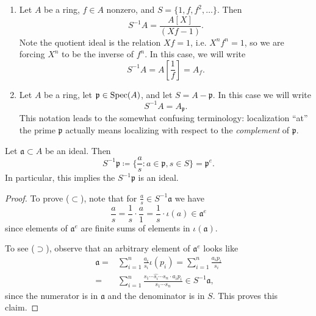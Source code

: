 \documentclass[12pt]{article}
\begin{document}
\begin{example}
	\hfill 
	\begin{enumerate}
		\item Let $A$ be a ring, $f\in A$ nonzero, and $S=\{1,f,f^2,\dots\}$. Then 
			\begin{equation*}
				S^{-1}A = \frac{A[X]}{(Xf-1)}.
			\end{equation*}
			Note the quotient ideal is the relation $Xf=1$, i.e. $X^nf^n=1$, so we are forcing $X^n$ to be the inverse of $f^n$. In this case, we will write 
			\begin{equation*}
				S^{-1}A = A[\frac{1}{f}] = A_f.
			\end{equation*}
		\item Let $A$ be a ring, let $\mathfrak{p}\in\text{Spec}(A)$, and let $S=A-\mathfrak{p}$. In this case we will write 
			\begin{equation*}
				S^{-1}A = A_\mathfrak{p}.
			\end{equation*}
			This notation leads to the somewhat confusing terminology: localization ``at'' the prime $\mathfrak{p}$ actually means localizing with respect to the \textit{complement} of $\mathfrak{p}$. 
	\end{enumerate}
\end{example}

\begin{proposition}
	Let $\mathfrak{a}\subset A$ be an ideal. Then 
	\begin{equation*}
		S^{-1}\mathfrak{p} \coloneqq \{\frac{a}{s} : a\in\mathfrak{p}, s\in S\} = \mathfrak{p}^e.
	\end{equation*}
	In particular, this implies the $S^{-1}\mathfrak{p}$ is an ideal. 
\end{proposition}
\begin{proof}
	To prove ($\subset$), note that for $\frac{a}{s}\in S^{-1}\mathfrak{a}$ we have 
	\begin{equation*}
		\frac{a}{s}=\frac{1}{s}\cdot\frac{a}{1} = \frac{1}{s} \cdot \iota(a) \in \mathfrak{a}^e
	\end{equation*}
	since elements of $\mathfrak{a}^e$ are finite sums of elements in $\iota(\mathfrak{a})$. 

	To see ($\supset$), observe that an arbitrary element of $\mathfrak{a}^e$ looks like 
	\begin{align*}
		\mathfrak{a} 
		=& \sum_{i=1}^n \frac{a_i}{s_i}\iota(p_i) = \sum_{i=1}^n \frac{a_ip_i}{s_i} \\
		=& \sum_{i=1}^n \frac{s_1\cdots \hat{s_i}\cdots s_n \cdot a_ip_i}{s_1\cdots s_n} \in S^{-1}\mathfrak{a},
	\end{align*}
	since the numerator is in $\mathfrak{a}$ and the denominator is in $S$. This proves this claim.
\end{proof}
\end{document}
